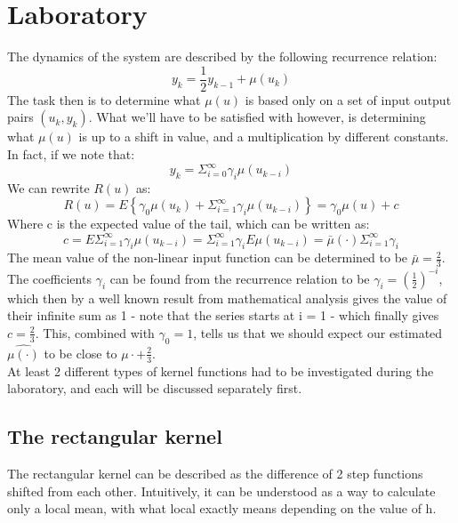 \section{Laboratory}
The dynamics of the system are described by the following recurrence relation:
\begin{equation}
    y_k = \frac{1}{2}y_{k-1} + \mu(u_k)
\end{equation}
The task then is to determine what $\mu(u)$ is based only on a set of input output pairs $(u_k,y_k)$. What we'll have to be satisfied with however, is determining what  $\mu(u)$ is up to a shift in value, and a multiplication by different constants. In fact, if we note that:
\begin{equation}
    y_k = \Sigma_{i=0}^{\infty}\gamma_i\mu(u_{k-i})
\end{equation}
We can rewrite $R(u)$ as:
\begin{equation}
    R(u) = E\left\{ \gamma_0\mu(u_k)  +  \Sigma_{i=1}^{\infty}\gamma_i\mu(u_{k-i}) \right\} = \gamma_0\mu(u) + c
\end{equation}
Where c is the expected value of the tail, which can be written as:
\begin{equation}
    c = E \Sigma_{i=1}^{\infty}\gamma_i\mu(u_{k-i}) = \Sigma_{i=1}^{\infty}\gamma_iE\mu(u_{k-i}) = \bar{\mu}(\cdot) \Sigma_{i=1}^{\infty}\gamma_i
\end{equation}
The mean value of the non-linear input function can be determined to be $\bar{\mu} = \frac{2}{3}$. The coefficients $\gamma_i$ can be found from the recurrence relation to be  $\gamma_i = (\frac{1}{2})^{-i}$, which then by a well known result from mathematical analysis gives the value of their infinite sum as 1 - note that the series starts at i = 1 - which finally gives $c = \frac{2}{3}$. This, combined with $\gamma_0 = 1$, tells us that we should expect our estimated $\hat{\mu(\cdot)}$ to be close to $\mu{\cdot} + \frac{2}{3}$.
\\
At least 2 different types of kernel functions had to be investigated during the laboratory, and each will be discussed separately first.
\subsection{The rectangular kernel}
The rectangular kernel can be described as the difference of 2 step functions shifted from each other. Intuitively, it can be understood as a way to calculate only a local mean, with what local exactly means depending on the value of h.

